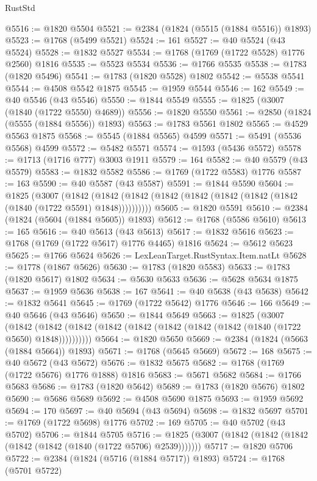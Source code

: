 \begin{lexlean}{RustStd}
\begin{coremodule}
@5516 := @1820 @5504
@5521 := @2384 (@1824 (@5515 (@1884 @5516)) @1893)
@5523 := @1768 (@5499 @5521)
@5524 := 161
@5527 := @40 @5524 (@43 @5524)
@5528 := @1832 @5527
@5534 := @1768 (@1769 (@1722 @5528) @1776 @2560) @1816
@5535 := @5523 @5534
@5536 := @1766 @5535
@5538 := @1783 (@1820 @5496)
@5541 := @1783 (@1820 @5528) @1802
@5542 := @5538 @5541
@5544 := @4508 @5542 @1875
@5545 := @1959 @5544
@5546 := 162
@5549 := @40 @5546 (@43 @5546)
@5550 := @1844 @5549
@5555 := @1825 (@3007 (@1840 (@1722 @5550) @4689))
@5556 := @1820 @5550
@5561 := @2850 (@1824 (@5555 (@1884 @5556)) @1893)
@5563 := @1783 @5561 @1802
@5565 := @4529 @5563 @1875
@5568 := @5545 (@1884 @5565) @4599
@5571 := @5491 (@5536 @5568) @4599
@5572 := @5482 @5571
@5574 := @1593 (@5436 @5572)
@5578 := @1713 (@1716 @777) @3003 @1911
@5579 := 164
@5582 := @40 @5579 (@43 @5579)
@5583 := @1832 @5582
@5586 := @1769 (@1722 @5583) @1776
@5587 := 163
@5590 := @40 @5587 (@43 @5587)
@5591 := @1844 @5590
@5604 := @1825
    (@3007
      (@1842 (@1842 (@1842 (@1842 (@1842 (@1842 (@1842 (@1842 (@1840 (@1722 @5591) @1848))))))))))
@5605 := @1820 @5591
@5610 := @2384 (@1824 (@5604 (@1884 @5605)) @1893)
@5612 := @1768 (@5586 @5610)
@5613 := 165
@5616 := @40 @5613 (@43 @5613)
@5617 := @1832 @5616
@5623 := @1768 (@1769 (@1722 @5617) @1776 @4465) @1816
@5624 := @5612 @5623
@5625 := @1766 @5624
@5626 := LexLeanTarget.RustSyntax.Item.natLt
@5628 := @1778 (@1867 @5626)
@5630 := @1783 (@1820 @5583)
@5633 := @1783 (@1820 @5617) @1802
@5634 := @5630 @5633
@5636 := @5628 @5634 @1875
@5637 := @1959 @5636
@5638 := 167
@5641 := @40 @5638 (@43 @5638)
@5642 := @1832 @5641
@5645 := @1769 (@1722 @5642) @1776
@5646 := 166
@5649 := @40 @5646 (@43 @5646)
@5650 := @1844 @5649
@5663 := @1825
    (@3007
      (@1842 (@1842 (@1842 (@1842 (@1842 (@1842 (@1842 (@1842 (@1840 (@1722 @5650) @1848))))))))))
@5664 := @1820 @5650
@5669 := @2384 (@1824 (@5663 (@1884 @5664)) @1893)
@5671 := @1768 (@5645 @5669)
@5672 := 168
@5675 := @40 @5672 (@43 @5672)
@5676 := @1832 @5675
@5682 := @1768 (@1769 (@1722 @5676) @1776 @1888) @1816
@5683 := @5671 @5682
@5684 := @1766 @5683
@5686 := @1783 (@1820 @5642)
@5689 := @1783 (@1820 @5676) @1802
@5690 := @5686 @5689
@5692 := @4508 @5690 @1875
@5693 := @1959 @5692
@5694 := 170
@5697 := @40 @5694 (@43 @5694)
@5698 := @1832 @5697
@5701 := @1769 (@1722 @5698) @1776
@5702 := 169
@5705 := @40 @5702 (@43 @5702)
@5706 := @1844 @5705
@5716 := @1825 (@3007 (@1842 (@1842 (@1842 (@1842 (@1842 (@1840 (@1722 @5706) @2539)))))))
@5717 := @1820 @5706
@5722 := @2384 (@1824 (@5716 (@1884 @5717)) @1893)
@5724 := @1768 (@5701 @5722)

\end{coremodule}
\end{lexlean}
